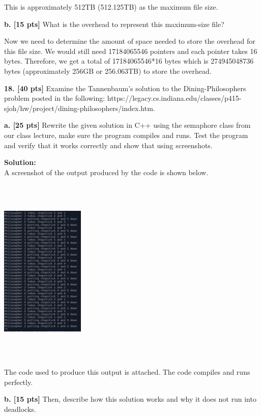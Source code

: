 \documentclass[12pt]{article}
\begin{document}
This is approximately 512TB (512.125TB) as the maximum file size. 

{\bf b. [15 pts]} What is the overhead to represent this maximum-size file?

Now we need to determine the amount of space needed to store the overhead for this file size. We would still need 17184065546 pointers and each pointer takes 16 bytes. Therefore, we get a total of 17184065546*16 bytes which is 274945048736 bytes (approximately 256GB or 256.063TB) to store the overhead. 

{\bf 18. [40 pts]} Examine the Tannenbaum’s solution to the Dining-Philosophers problem posted in the following: https://legacy.cs.indiana.edu/classes/p415-sjoh/hw/project/dining-philosophers/index.htm.

{\bf a. [25 pts]} Rewrite the given solution in C++ using the semaphore class from our class lecture, make sure the program compiles and runs. Test the program and verify that it works correctly and show that using screenshots.

{\bf Solution:}\\

A screenshot of the output produced by the code is shown below. 

\begin{center}
\includegraphics[width=4cm, height=9cm]{q18Output}
\end{center}

The code used to produce this output is attached. The code compiles and runs perfectly. 

{\bf b. [15 pts]} Then, describe how this solution works and why it does not run into deadlocks.
\end{document}
